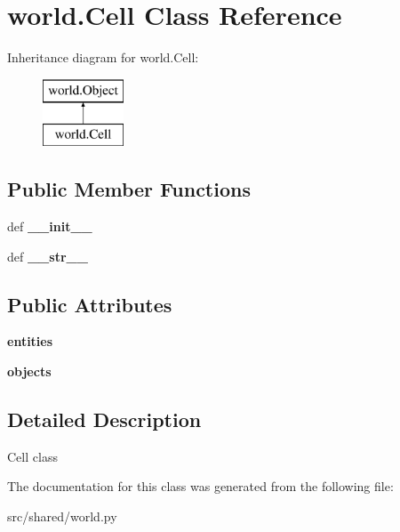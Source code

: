 \hypertarget{classworld_1_1_cell}{\section{world.\-Cell \-Class \-Reference}
\label{classworld_1_1_cell}
}
\-Inheritance diagram for world.\-Cell\-:\begin{figure}[H]
\begin{center}
\leavevmode
\includegraphics[height=2.000000cm]{classworld_1_1_cell}
\end{center}
\end{figure}
\subsection*{\-Public \-Member \-Functions}
\begin{DoxyCompactItemize}
\item 
\hypertarget{classworld_1_1_cell_a3dd387b6af13f7450acb97fb40c13a0e}{def {\bfseries \-\_\-\-\_\-init\-\_\-\-\_\-}}\label{classworld_1_1_cell_a3dd387b6af13f7450acb97fb40c13a0e}

\item 
\hypertarget{classworld_1_1_cell_a9c73b7080f839c1eee41bb97306428d9}{def {\bfseries \-\_\-\-\_\-str\-\_\-\-\_\-}}\label{classworld_1_1_cell_a9c73b7080f839c1eee41bb97306428d9}

\end{DoxyCompactItemize}
\subsection*{\-Public \-Attributes}
\begin{DoxyCompactItemize}
\item 
\hypertarget{classworld_1_1_cell_abacc61990c80c148f496f72be2f43dc6}{{\bfseries entities}}\label{classworld_1_1_cell_abacc61990c80c148f496f72be2f43dc6}

\item 
\hypertarget{classworld_1_1_cell_afd921144822811cc4c904bd1f0f3f746}{{\bfseries objects}}\label{classworld_1_1_cell_afd921144822811cc4c904bd1f0f3f746}

\end{DoxyCompactItemize}


\subsection{\-Detailed \-Description}
\begin{DoxyVerb}Cell class \end{DoxyVerb}
 

\-The documentation for this class was generated from the following file\-:\begin{DoxyCompactItemize}
\item 
src/shared/world.\-py\end{DoxyCompactItemize}
